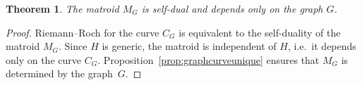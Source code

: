 \documentclass[12pt]{extarticle}
\newtheorem{theorem}{Theorem}
\theoremstyle{definition}
\numberwithin{theorem}{section}
\theoremstyle{plain}\newtheorem{ithm}{Theorem}
\begin{document}
\begin{theorem} \label{thm:MG}
  The matroid $M_G$ is self-dual and depends only on the graph $G$.
\end{theorem}

\begin{proof}
Riemann--Roch for  the curve $C_G$  is equivalent to the self-duality of the matroid $M_G$. 
  Since $H$ is generic,
  the matroid is independent of $H$, i.e.~it depends only on the curve $C_G$.
  Proposition~\ref{prop:graphcurveunique} ensures that
  $M_G$ is determined by the graph~$G$.
\end{proof}
\end{document}
